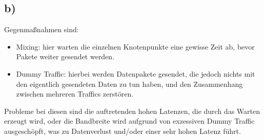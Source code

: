 \documentclass[]{article}
\begin{document}
\subsection*{b)} 
Gegenmaßnahmen sind:
\begin{itemize}
	\item Mixing: hier warten die einzelnen Knotenpunkte eine gewisse Zeit ab, bevor Pakete weiter gesendet werden.
	\item Dummy Traffic: hierbei werden Datenpakete gesendet, die jedoch nichts mit den eigentlich gesendeten Daten zu tun haben, und den Zusammenhang zwischen mehreren Traffics zerstören.
\end{itemize}
Probleme bei diesen sind die auftretenden hohen Latenzen, die durch das Warten erzeugt wird, oder die Bandbreite wird aufgrund von exzessiven Dummy Traffic ausgeschöpft, was zu Datenverlust und/oder einer sehr hohen Latenz führt.
\end{document}
